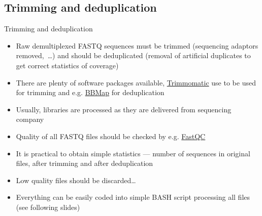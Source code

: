 \documentclass[compress,  xelatex, 11pt, xcolor=x11names, aspectratio=169,
	hyperref={
		bookmarks=true,
		unicode=true,
		colorlinks=true,
		pdftitle={HybSeq course},
		plainpages=false,
		pdfauthor={Vojtech Zeisek},
		pdfsubject={Practical processing of HybSeq target enrichment sequencing data on computing grids like MetaCentrum},
		pdfcreator={XeLaTeX},
		pdfkeywords={BASH, command line, GNU, HybSeq, Linux, MetaCentrum, sequencing shell, target enrichment},
		linkcolor=Turquoise4, %
		anchorcolor=DodgerBlue4, %
		citecolor=DodgerBlue4, %
		filecolor=DodgerBlue4, %
		menucolor=Tan4, %
		urlcolor=DarkOliveGreen4 %
		},
	url={hyphens, lowtilde} %
	]{beamer}
\begin{document}
\subsection{Trimming and deduplication}

\begin{frame}{Trimming and deduplication}
	\begin{itemize}
		\item Raw demultiplexed FASTQ sequences must be trimmed (sequencing adaptors removed,~\ldots) and should be deduplicated (removal of artificial duplicates to get correct statistics of coverage)
		\item There are plenty of software packages available, \href{http://www.usadellab.org/cms/?page=trimmomatic}{Trimmomatic} use to be used for trimming and e.g. \href{https://sourceforge.net/projects/bbmap/}{BBMap} for deduplication
		\item Usually, libraries are processed as they are delivered from sequencing company
		\item Quality of all FASTQ files should be checked by e.g. \href{https://www.bioinformatics.babraham.ac.uk/projects/fastqc/}{FastQC}
		\item It is practical to obtain simple statistics --- number of sequences in original files, after trimming and after deduplication
		\item Low quality files should be discarded\ldots
		\item Everything can be easily coded into simple BASH script processing all files (see following slides)
	\end{itemize}
\end{frame}
\end{document}
